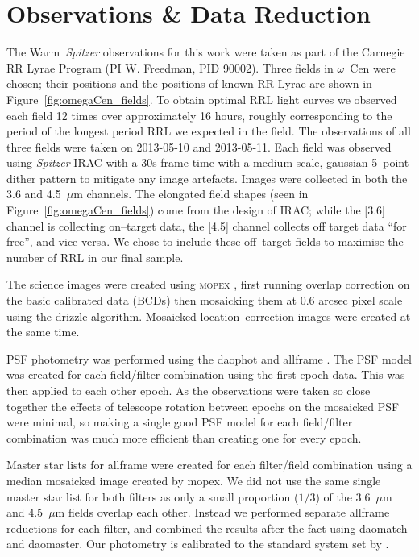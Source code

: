 \documentclass[a4paper,fleqn,usenatbib]{mnras}
\begin{document}
\section{Observations \& Data Reduction}
\label{sec:observations}
The Warm~\textit{Spitzer} observations for this work were taken as part of the Carnegie RR Lyrae Program (PI W. Freedman, PID 90002). Three fields in $\omega$~Cen were chosen; their positions and the positions of known RR Lyrae are shown in Figure~\ref{fig:omegaCen_fields}. To obtain optimal RRL light curves we observed each field 12 times over approximately 16 hours, roughly corresponding to the period of the longest period RRL we expected in the field. The observations of all three fields were taken on 2013-05-10 and 2013-05-11. Each field was observed using {\it Spitzer} IRAC \citep{2004ApJS..154...10F} with a 30s frame time with a medium scale, gaussian 5--point dither pattern to mitigate any image artefacts. Images were collected in both the 3.6 and 4.5~$\mu$m channels. 
The elongated field shapes (seen in Figure~\ref{fig:omegaCen_fields}) come from the design of IRAC; while the [3.6] channel is collecting on--target data, the [4.5] channel collects off target data ``for free'', and vice versa. We chose to include these off--target fields to maximise the number of RRL in our final sample. 

The science images were created using \textsc{mopex} \citep{2006SPIE.6274E..0CM}, first running overlap correction on the basic calibrated data (BCDs) then mosaicking them at 0.6 arcsec pixel scale using the drizzle algorithm. Mosaicked location--correction images were created at the same time. 

PSF photometry was performed using the {\sc daophot} and {\sc allframe} \citep{1987PASP...99..191S, 1994PASP..106..250S}. The PSF model was created for each field/filter combination using the first epoch data. This was then applied to each other epoch. As the observations were taken so close together the effects of telescope rotation between epochs on the mosaicked PSF were minimal, so making a single good PSF model for each field/filter combination was much more efficient than creating one for every epoch. 

Master star lists for {\sc allframe} were created for each filter/field combination using a median mosaicked image created by {\sc mopex}. We did not use the same single master star list for both filters as only a small proportion ($1/3$) of the 3.6~$\mu$m and 4.5~$\mu$m fields overlap each other. Instead we performed separate {\sc allframe} reductions for each filter, and combined the results after the fact using {\sc daomatch} and {\sc daomaster}. Our photometry is calibrated to the standard system set by \citet{2005PASP..117..978R}.
\end{document}
